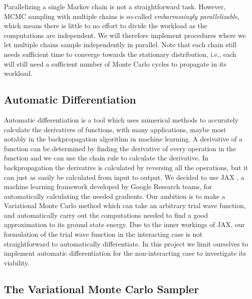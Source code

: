 Parallelizing a single Markov chain is not a straightforward task. However, MCMC sampling with multiple chains is so-called \textit{embarrassingly parallelizable}, which means there is little to no effort to divide the workload as the computations are independent. We will therefore implement procedures where we let multiple chains sample independently in parallel. Note that each chain still needs sufficient time to converge towards the stationary distribution, i.e., each will still need a sufficient number of Monte Carlo cycles to propagate in its workload. 

\subsection{Automatic Differentiation}

Automatic differentiation is a tool which uses numerical methods to accurately calculate the derivatives of functions, with many applications, maybe most notably in the backpropagation algorithm in machine learning. A derivative of a function can be determined by finding the derivative of every operation in the function and we can use the chain rule to calculate the derivative. In backpropagation the derivative is calculated by reversing all the operations, but it can just as easily be calculated from input to output.
We decided to use JAX \citep{jax2018github}, a machine learning framework developed by Google Research teams, for automatically calculating the needed gradients. Our ambition is to make a Variational Monte Carlo method which can take an arbitrary trial wave function, and automatically carry out the computations needed to find a good approximation to its ground state energy. Due to the inner workings of JAX, our formulation of the trial wave function in the interacting case is not straightforward to automatically differentiate. 
In this project we limit ourselves to implement automatic differentiation for the non-interacting case to investigate its viability. 

\subsection{The Variational Monte Carlo Sampler}\label{seq:vmc_framework}

